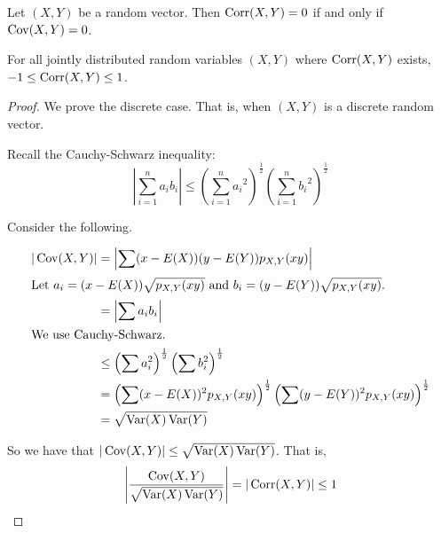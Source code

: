 \begin{theorem}[]
	Let $(X,Y)$ be a random vector. Then $\operatorname{Corr}(X,Y)=0$ if and only if $\operatorname{Cov}(X,Y)=0$.
\end{theorem}

\begin{theorem}[]
	For all jointly distributed random variables $(X,Y)$ where $\operatorname{Corr}(X,Y)$ exists, $-1\leq\operatorname{Corr}(X,Y)\leq 1$.
\end{theorem}

\begin{proof}
	We prove the discrete case. That is, when $(X,Y)$ is a discrete random vector.

	Recall the Cauchy-Schwarz inequality:
	$$\left|\sum_{i=1}^na_ib_i\right|\leq\left(\sum_{i=1}^n{a_i}^2\right)^{\frac 12}\left(\sum_{i=1}^n{b_i}^2\right)^{\frac 12}$$

	Consider the following.

	\begin{align*}
		|\operatorname{Cov}(X,Y)|&=\left|\sum(x-E(X))(y-E(Y))p_{X,Y}(xy)\right|\\
		\intertext{Let $a_i=(x-E(X))\sqrt{p_{X,Y}(xy)}$ and $b_i=(y-E(Y))\sqrt{p_{X,Y}(xy)}$.}
		&=\left|\sum a_ib_i\right|\\
		\intertext{We use Cauchy-Schwarz.}
		&\leq\left(\sum a_i^2\right)^{\frac 12}\left(\sum b_i^2\right)^{\frac 12}\\
		&=\left(\sum (x-E(X))^2p_{X,Y}(xy)\right)^{\frac 12}\left(\sum (y-E(Y))^2p_{X,Y}(xy)\right)^{\frac 12}\\
		&=\sqrt{\operatorname{Var}(X)\operatorname{Var}(Y)}
	\end{align*}

	So we have that $|\operatorname{Cov}(X,Y)|\leq \sqrt{\operatorname{Var}(X)\operatorname{Var}(Y)}$. That is,
	$$\left|\frac{\operatorname{Cov}(X,Y)}{\sqrt{\operatorname{Var}(X)\operatorname{Var}(Y)}}\right|=|\operatorname{Corr}(X,Y)|\leq 1$$
\end{proof}

